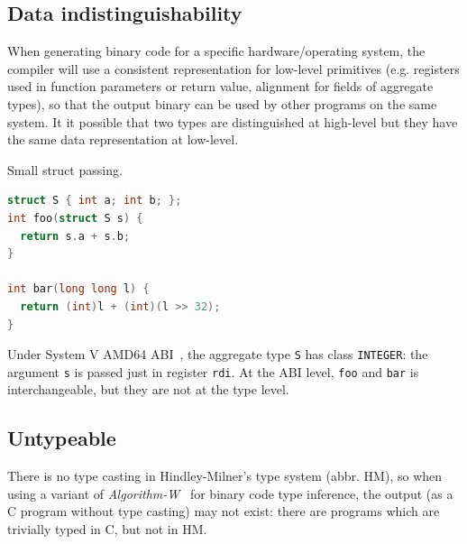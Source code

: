\documentclass[a4paper]{llncs}
\begin{document}
\subsection{Data indistinguishability}
When generating binary code for a specific hardware/operating system, the compiler will
use a consistent representation for low-level primitives (e.g. registers used in
function parameters or return value, alignment for fields of aggregate types), so that
the output binary can be used by other programs on the same system. It it possible that
two types are distinguished at high-level but they have the same data representation
at low-level.

\begin{example}\label{exa:register_struct}
Small struct passing.

\begin{lstlisting}[frame=lines, language={C}]
struct S { int a; int b; };
int foo(struct S s) {
  return s.a + s.b;
}

int bar(long long l) {
  return (int)l + (int)(l >> 32);
}
\end{lstlisting}

Under System V AMD64 ABI~\cite{lu_system_nodate}, the aggregate type \texttt{S}
has class \texttt{INTEGER}: the argument \texttt{s} is passed just in register \texttt{rdi}.
At the ABI level, \texttt{foo} and \texttt{bar} is interchangeable, but they are not at
the type level.
\end{example}

\subsection{Untypeable}

There is no type casting in Hindley-Milner's type system (abbr. HM), so when using a variant of
\emph{Algorithm-W}~\cite{milner_theory_1978} for binary code type inference, the output (as a
C program without type casting) may not exist: there are programs which are
trivially typed in C, but not in HM.
\end{document}
